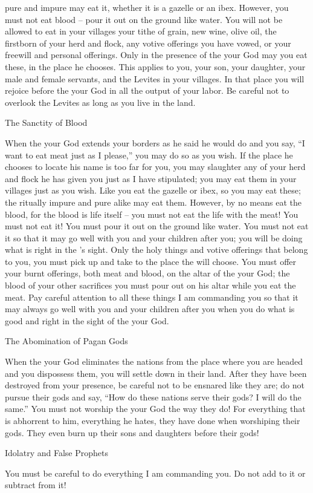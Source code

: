{pure
and impure
may eat
it, whether it is a gazelle
or an ibex.
However,
you must not
eat
blood
– pour
it out on
the ground
like water.
You will not
be allowed
to eat
in your villages
your tithe
of grain,
new wine,
olive oil,
the firstborn
of your herd
and flock,
any
votive offerings
you have
vowed,
or your freewill
and personal
offerings.
Only
in the presence
of the {}
your God
may you eat
these, in the place
he chooses.
This applies to you,
your son,
your daughter,
your male
and female
servants,
and the Levites
in your villages.
In that
place you will rejoice
before
the {}
your God
in all
the output of your labor.
Be careful
not
to overlook
the
Levites
as long
as you live in the land.
\par }{\SH The Sanctity of Blood
\par }{\PP {}When
the {}
your God
extends
your borders
as
he said
he would do and you say,
“I want
to eat
meat
just as I please,”
you may do so as you wish.
If
the place
he chooses
to locate
his name
is too far
for you, you may slaughter
any
of your herd
and flock
he has
given
you just
as I have stipulated;
you may eat
them in your
villages
just
as you wish.
Like
you eat
the gazelle
or ibex,
so
you may eat
these; the ritually impure
and pure
alike
may eat them.
However,
by no means
eat
the blood,
for
the blood
is life itself – you must not eat the life with the meat!
You must not
eat
it! You must pour
it out on
the ground
like water.
You must not
eat
it so that it may
go well
with you and your children
after
you; you will be doing
what is right
in the
{}’s
sight.
Only
the holy
things and votive offerings
that
belong
to you, you must pick up
and take
to
the place
the {}
will choose.
You must offer
your burnt offerings,
both meat
and blood,
on
the altar
of the {}
your God;
the blood
of your other sacrifices
you must pour
out on
his altar
while you eat
the meat.
Pay careful
attention
to all
these
things
I am
commanding
you so that it may
always
go well
with you and your children
after
you when
you do
what is good
and right
in the sight
of the {}
your God.
\par }{\SH The Abomination of Pagan Gods
\par }{\PP {}When the
{}
your God
eliminates
the nations
from the place where you
are headed
and you dispossess
them, you will settle down
in their land.
After
they have been destroyed
from your presence,
be careful
not
to be
ensnared
like they are; do not
pursue
their gods
and say,
“How
do these
nations
serve
their gods? I
will do
the same.”
You must not
worship
the {}
your God
the way
they do! For
everything
that is abhorrent
to him, everything
he hates,
they have done
when worshiping their gods.
They even
burn up
their sons
and daughters
before their gods!
\par }{\SH Idolatry and False Prophets
\par }{\PP {} You must be careful
to do
everything
I am
commanding
you. Do
not
add
to it or
subtract
from it!

}
